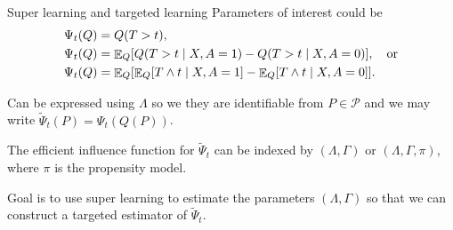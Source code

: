 \documentclass[smaller]{beamer}\usepackage{listings}
\begin{document}
\begin{frame}[label={sec:org09bd8ab}]{Super learning and targeted learning}
\small Parameters of interest could be
\begin{align*}
  \Psi_t(Q) &  = Q(T > t),
  \\
  \Psi_t(Q)
    &=
      {\mathop{{\mathbb{E}}}}_Q{\left[ Q(T > t \mid X, A=1) - Q(T > t \mid X, A=0) \right]},
      \quad \text{or} 
  \\
  \Psi_t(Q) & = {\mathop{{\mathbb{E}}}}_Q{\left[ {\mathop{{\mathbb{E}}}}_Q[T \wedge t \mid X, A=1] - {\mathop{{\mathbb{E}}}}_Q[T \wedge t \mid
              X, A=0]   \right]}.
\end{align*}

\vfill

Can be expressed using \(\Lambda\) so we they are identifiable from \(P \in
\mathcal{P}\) and we may write \(\tilde{\Psi}_t(P) = \Psi_t(Q(P))\).

\vfill

The efficient influence function for \(\tilde{\Psi}_t\) can be indexed by
\((\Lambda, \Gamma)\) or \((\Lambda, \Gamma, \pi)\), where \(\pi\) is the propensity
model.

\vfill

Goal is to use super learning to estimate the parameters \((\Lambda, \Gamma)\) so
that we can construct a targeted estimator of \(\tilde{\Psi}_t\).
\end{frame}
\end{document}

